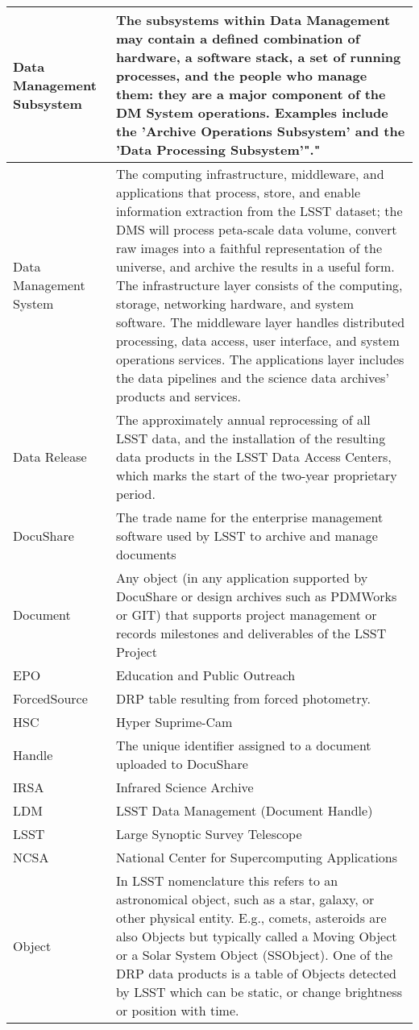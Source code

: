 \begin{longtable}{|p{}|p{}|}
Data Management Subsystem & The subsystems within Data Management may contain a defined combination of hardware, a software stack, a set of running processes, and the people who manage them: they are a major component of the DM System operations. Examples include the 'Archive Operations Subsystem' and the 'Data Processing Subsystem'"." \\\hline
Data Management System & The computing infrastructure, middleware, and applications that process, store, and enable information extraction from the LSST dataset; the DMS will process peta-scale data volume, convert raw images into a faithful representation of the universe, and archive the results in a useful form. The infrastructure layer consists of the computing, storage, networking hardware, and system software. The middleware layer handles distributed processing, data access, user interface, and system operations services. The applications layer includes the data pipelines and the science data archives' products and services. \\\hline
Data Release & The approximately annual reprocessing of all LSST data, and the installation of the resulting data products in the LSST Data Access Centers, which marks the start of the two-year proprietary period. \\\hline
DocuShare & The trade name for the enterprise management software used by LSST to archive and manage documents \\\hline
Document & Any object (in any application supported by DocuShare or design archives such as PDMWorks or GIT) that supports project management or records milestones and deliverables of the LSST Project \\\hline
EPO & Education and Public Outreach \\\hline
ForcedSource & DRP table resulting from forced photometry. \\\hline
HSC & Hyper Suprime-Cam \\\hline
Handle & The unique identifier assigned to a document uploaded to DocuShare \\\hline
IRSA & Infrared Science Archive \\\hline
LDM & LSST Data Management (Document Handle) \\\hline
LSST & Large Synoptic Survey Telescope \\\hline
NCSA & National Center for Supercomputing Applications \\\hline
Object & In LSST nomenclature this refers to an astronomical object, such as a star, galaxy, or other physical entity. E.g., comets, asteroids are also Objects but typically called a Moving Object or a Solar System Object (SSObject). One of the DRP data products is a table of Objects detected by LSST which can be static, or change brightness or position with time. \\\hline

\end{longtable}
